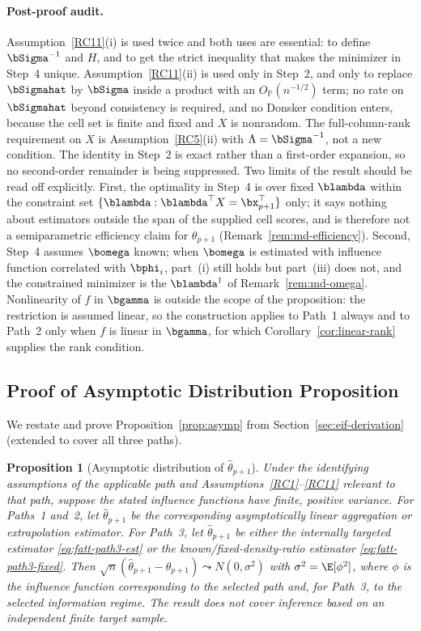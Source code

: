 \documentclass{article}
\newtheorem*{proposition*}{Proposition}
\renewcommand{\P}{\mathbb{P}}
\begin{document}
\paragraph{Post-proof audit.}
Assumption~\ref{RC11}(i) is used twice and both uses are essential: to define $\bSigma^{-1}$ and $H$, and to get the strict inequality that makes the minimizer in Step~4 unique. Assumption~\ref{RC11}(ii) is used only in Step~2, and only to replace $\bSigmahat$ by $\bSigma$ inside a product with an $O_{\P}(n^{-1/2})$ term; no rate on $\bSigmahat$ beyond consistency is required, and no Donsker condition enters, because the cell set is finite and fixed and $X$ is nonrandom. The full-column-rank requirement on $X$ is Assumption~\ref{RC5}(ii) with $\Lambda = \bSigma^{-1}$, not a new condition. The identity in Step~2 is exact rather than a first-order expansion, so no second-order remainder is being suppressed. Two limits of the result should be read off explicitly. First, the optimality in Step~4 is over fixed $\blambda$ within the constraint set $\{\blambda : \blambda^{\top}X = \bx_{p+1}^{\top}\}$ only; it says nothing about estimators outside the span of the supplied cell scores, and is therefore not a semiparametric efficiency claim for $\theta_{p+1}$ (Remark~\ref{rem:md-efficiency}). Second, Step~4 assumes $\bomega$ known; when $\bomega$ is estimated with influence function correlated with $\bphi_i$, part~(i) still holds but part~(iii) does not, and the constrained minimizer is the $\blambda^{\dagger}$ of Remark~\ref{rem:md-omega}. Nonlinearity of $f$ in $\bgamma$ is outside the scope of the proposition: the restriction is assumed linear, so the construction applies to Path~1 always and to Path~2 only when $f$ is linear in $\bgamma$, for which Corollary~\ref{cor:linear-rank} supplies the rank condition.

\subsection{Proof of Asymptotic Distribution Proposition}\label{app:prop-asymp}

We restate and prove Proposition~\ref{prop:asymp} from Section~\ref{sec:eif-derivation} (extended to cover all three paths).

\begin{proposition*}[Asymptotic distribution of $\widehat{\theta}_{p+1}$]
Under the identifying assumptions of the applicable path and Assumptions~\ref{RC1}--\ref{RC11} relevant to that path, suppose the stated influence functions have finite, positive variance. For Paths~1 and~2, let $\widehat{\theta}_{p+1}$ be the corresponding asymptotically linear aggregation or extrapolation estimator. For Path~3, let $\widehat{\theta}_{p+1}$ be either the internally targeted estimator \eqref{eq:fatt-path3-est} or the known/fixed-density-ratio estimator \eqref{eq:fatt-path3-fixed}. Then $\sqrt{n}(\widehat{\theta}_{p+1} - \theta_{p+1}) \leadsto N(0, \sigma^2)$ with $\sigma^2 = \E[\phi^2]$, where $\phi$ is the influence function corresponding to the selected path and, for Path~3, to the selected information regime. The result does not cover inference based on an independent finite target sample.
\end{proposition*}
\end{document}
